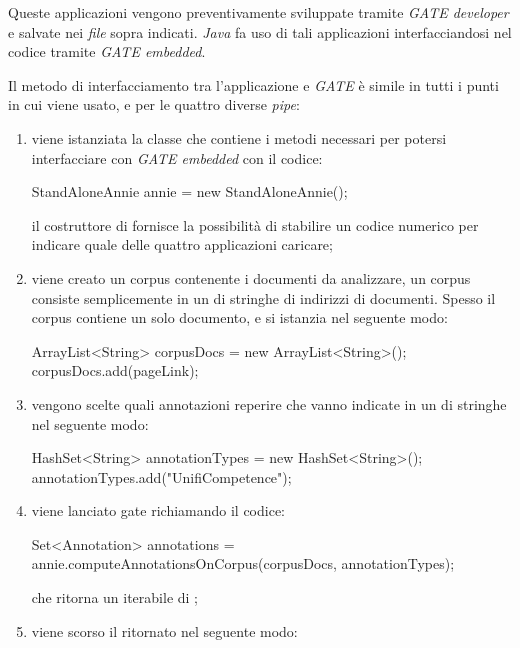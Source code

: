 \documentclass[tesi.tex]{subfiles}
\begin{document}
Queste applicazioni vengono preventivamente sviluppate tramite
\emph{GATE developer} e salvate nei \emph{file} sopra
indicati. \emph{Java} fa uso di tali applicazioni interfacciandosi nel codice tramite
\emph{GATE embedded}.

Il metodo di interfacciamento tra l'applicazione e
\emph{GATE} \`e simile in tutti i punti in cui viene usato, e per
le quattro diverse \emph{pipe}:
\begin{enumerate}
\item viene istanziata la classe  che contiene i
  metodi necessari per potersi interfacciare con \emph{GATE
  embedded} con il codice:
  \begin{javablock}
StandAloneAnnie annie = new StandAloneAnnie();
  \end{javablock}
  il costruttore di  fornisce la possibilit\`a
  di stabilire un codice numerico per indicare quale delle quattro
  applicazioni caricare;

\item viene creato un corpus contenente i documenti da analizzare, un
  corpus consiste semplicemente in un  di stringhe di indirizzi
  di documenti. Spesso il corpus contiene un solo documento, e si
  istanzia nel seguente modo:
  \begin{javablock}
ArrayList<String> corpusDocs = new ArrayList<String>();
corpusDocs.add(pageLink);
  \end{javablock}

\item vengono scelte quali annotazioni reperire che vanno indicate
  in un  di stringhe nel seguente modo:
  \begin{javablock}
HashSet<String> annotationTypes = new HashSet<String>();
annotationTypes.add("UnifiCompetence");
  \end{javablock}

\item viene lanciato gate richiamando il codice:
  \begin{javablock}
Set<Annotation> annotations = annie.computeAnnotationsOnCorpus(corpusDocs, annotationTypes);
  \end{javablock}
  che ritorna un  iterabile di ;

\item viene scorso il  ritornato nel seguente modo:
  \begin{javablock}
Iterator<Annotation> annotIter = annotations.iterator();
while(annotIter.hasNext()){
  Annotation currentAnnotation = (Annotation)annotIter.next();
  ...
  \end{javablock}


\end{enumerate}
\end{document}
